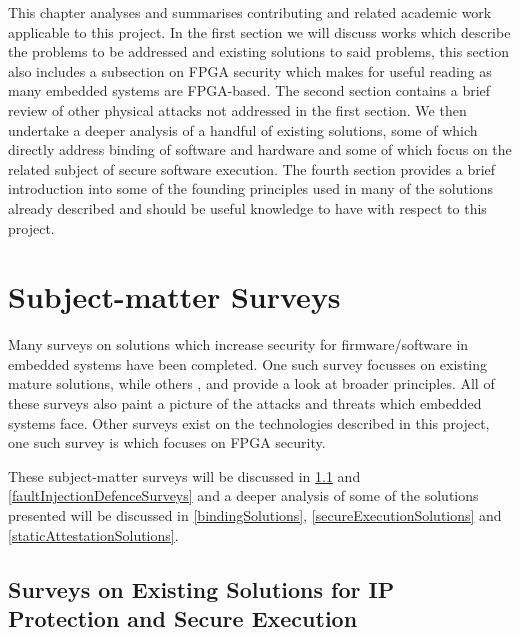 This chapter analyses and summarises contributing and related academic work applicable to this project. In the first section we will discuss works which describe the problems to be addressed and existing solutions to said problems, this section also includes a subsection on FPGA security which makes for useful reading as many embedded systems are FPGA-based. The second section contains a brief review of other physical attacks not addressed in the first section. We then undertake a deeper analysis of a handful of existing solutions, some of which directly address binding of software and hardware and some of which focus on the related subject of secure software execution. The fourth section provides a brief introduction into some of the founding principles used in many of the solutions already described and should be useful knowledge to have with respect to this project.

\section{Subject-matter Surveys}\label{subjectMatterSurveys}

Many surveys on solutions which increase security for firmware/software in embedded systems have been completed. One such survey \cite{Shepherd2016} focusses on existing mature solutions, while others \cite{Bryant2004}, \cite{Collberg2002} and \cite{Theissing2013} provide a look at broader principles. All of these surveys also paint a picture of the attacks and threats which embedded systems face. Other surveys exist on the technologies described in this project, one such survey is \cite{Drimer2008} which focuses on FPGA security.

These subject-matter surveys will be discussed in \ref{solutionSurveys} and \ref{faultInjectionDefenceSurveys} and a deeper analysis of some of the solutions presented will be discussed in \ref{bindingSolutions}, \ref{secureExecutionSolutions} and \ref{staticAttestationSolutions}.


\subsection{Surveys on Existing Solutions for IP Protection and Secure Execution}\label{solutionSurveys}

